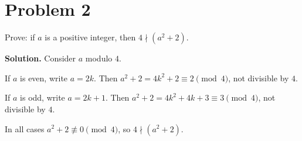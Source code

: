 \section*{Problem 2}

Prove: if $a$ is a positive integer, then $4\nmid (a^{2}+2)$.

\textbf{Solution.}
Consider $a$ modulo $4$.

If $a$ is even, write $a=2k$. Then $a^{2}+2=4k^{2}+2\equiv 2 \pmod{4}$, not divisible by $4$.

If $a$ is odd, write $a=2k+1$. Then $a^{2}+2=4k^{2}+4k+3\equiv 3 \pmod{4}$, not divisible by $4$.

In all cases $a^{2}+2\not\equiv 0\pmod{4}$, so $4\nmid (a^{2}+2)$.
